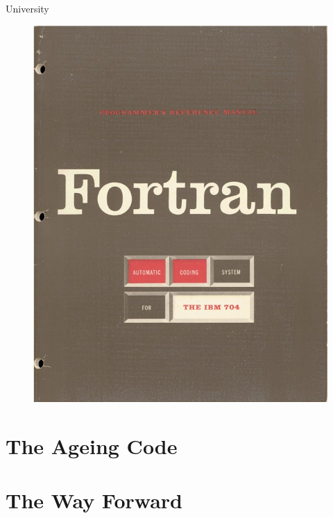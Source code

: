\documentclass{beamer}
\begin{document}
\begin{frame}{University}
\begin{figure}
      \includegraphics[scale=0.1]{images/fortran}
    \end{figure}
  \end{frame}

\section{The Ageing Code}

\section{The Way Forward}
\end{document}
